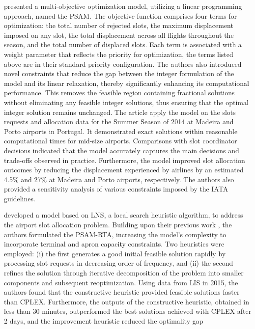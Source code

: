  presented a multi-objective optimization model, utilizing a linear programming approach, named the \acrfull{PSAM}. The objective function comprises four terms for optimization: the total number of rejected slots, the maximum displacement imposed on any slot, the total displacement across all flights throughout the season, and the total number of displaced slots. Each term is associated with a weight parameter that reflects the priority for optimization, the terms listed above are in their standard priority configuration. The authors also introduced novel constraints that reduce the gap between the integer formulation of the model and its linear relaxation, thereby significantly enhancing its computational performance. This removes the feasible region containing fractional solutions without eliminating any feasible integer solutions, thus ensuring that the optimal integer solution remains unchanged. The article apply the model on the slots requests and allocation data for the Summer Season of 2014 at Madeira and Porto airports in Portugal. It demonstrated exact solutions within reasonable computational times for mid-size airports. Comparisons with slot coordinator decisions indicated that the model accurately captures the main decisions and trade-offs observed in practice. Furthermore, the model improved slot allocation outcomes by reducing the displacement experienced by airlines by an estimated 4.5\% and 27\% at Madeira and Porto airports, respectively. The authors also provided a sensitivity analysis of various constraints imposed by the IATA guidelines.



 developed a model based on \acrfull{LNS}, a local search heuristic algorithm, to address the airport slot allocation problem. Building upon their previous work \cite{ribeiro2018optimization}, the authors formulated the \acrfull{PSAM-RTA}, increasing the model's complexity to incorporate terminal and apron capacity constraints. Two heuristics were employed: (i) the first generates a good initial feasible solution rapidly by processing slot requests in decreasing order of frequency, and (ii) the second refines the solution through iterative decomposition of the problem into smaller components and subsequent reoptimization. Using data from \acrfull{LIS} in 2015, the authors found that the constructive heuristic provided feasible solutions faster than CPLEX. Furthermore, the outputs of the constructive heuristic, obtained in less than 30 minutes, outperformed the best solutions achieved with CPLEX after 2 days, and the improvement heuristic reduced the optimality gap

